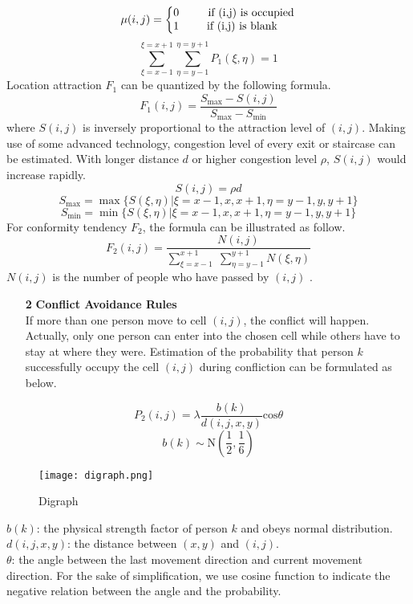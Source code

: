 \documentclass{mcmthesis}
\begin{document}
\[
	\mu(i,j)=\left\{\begin{matrix}
			0&\textrm{\quad \; if (i,j) is occupied}\\
			1&\textrm{if (i,j) is blank}
	\end{matrix}\right.
\]
\[
	\sum\limits_{\xi=x-1}^{\xi=x+1}\sum\limits_{\eta=y-1}^{\eta=y+1}P_1(\xi,\eta)=1
\]
\indent Location attraction \(F_1\) can be quantized by the following formula.
\[
	F_1(i,j)=\frac{S_\mathrm{max}-S(i,j)}{S_\mathrm{max}-S_\mathrm{min}}
\]
\indent where \(S(i,j)\) is inversely proportional to the attraction  level of \((i,j)\). Making use of some advanced technology, congestion level of every exit or staircase can be estimated. With longer distance \(d\) or higher congestion level \(\rho\), \(S(i,j)\) would increase rapidly.
\[
	S(i,j)=\rho d
\]
\[
	S_\mathrm{max}=\max\{S(\xi,\eta)|\xi=x-1,x,x+1,\eta=y-1,y,y+1\}
\]
\[
	S_\mathrm{min}=\min\{S(\xi,\eta)|\xi=x-1,x,x+1,\eta=y-1,y,y+1\}
\]
\indent For conformity tendency \(F_2\), the formula can be illustrated as follow.
\[
	F_2(i,j)=\frac{N(i,j)}{\sum\limits_{\xi=x-1}^{x+1}\;\sum\limits_{\eta=y-1}^{y+1}N(\xi,\eta)}
\]
\indent \(N(i,j)\) is the number of people who have passed by \((i,j)\) .
\begin{itemize}
	\item[\textbf {2}] \textbf {Conflict Avoidance Rules}\\
		\noindent If more than one person move to cell \((i,j)\), the conflict will happen. Actually, only one person can enter into the chosen cell while others have to stay at where they were.  Estimation of the probability that person \(k\) successfully occupy the cell \((i,j)\) during confliction can be formulated as below.
\end{itemize}
\[
	P_2(i,j)=\lambda\frac{b(k)}{d(i,j,x,y)}\mathrm{cos}\theta
\]
\[
	b(k)\sim\mathrm{N}(\frac{1}{2},\frac{1}{6})
\]
\begin{figure}[htbp]
	\centering
	\caption{Digraph}
	\texttt{[image: digraph.png]}
\end{figure}
\par\indent  \quad \( b(k)\): the physical strength factor of person \(k\) and obeys normal distribution.\\
\indent  \quad \(d(i,j,x,y)\): the distance between \((x,y)\) and \((i,j)\).\\
\indent   \quad \(\theta\): the angle between the last movement direction and current movement direction. For the sake of simplification, we use cosine function to indicate the negative relation between the angle and the probability.\\
\end{document}
